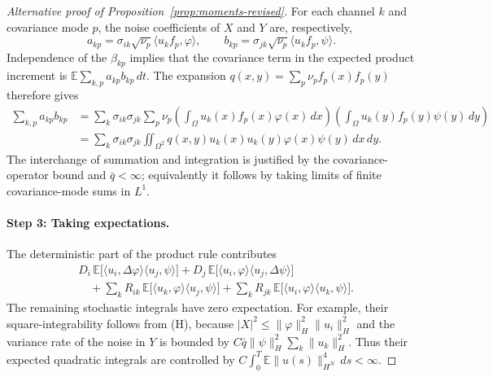 \begin{proof}[Alternative proof of Proposition~\ref{prop:moments-revised}]
For each channel $k$ and covariance mode $p$, the noise coefficients
of $X$ and $Y$ are, respectively,
\[
a_{kp}=\sigma_{ik}\sqrt{\nu_p}\langle u_k f_p,\varphi\rangle,
\qquad
b_{kp}=\sigma_{jk}\sqrt{\nu_p}\langle u_k f_p,\psi\rangle.
\]
Independence of the $\beta_{kp}$ implies that the covariance term
in the expected product increment is
$\mathbb E\sum_{k,p}a_{kp}b_{kp}\,dt$.
The expansion $q(x,y)=\sum_p\nu_p f_p(x)f_p(y)$ therefore gives
\begin{align*}
\sum_{k,p}a_{kp}b_{kp}
&=\sum_k\sigma_{ik}\sigma_{jk}
  \sum_p\nu_p
   \left(\int_{\Omega}u_k(x)f_p(x)\varphi(x)\,dx\right)
   \left(\int_{\Omega}u_k(y)f_p(y)\psi(y)\,dy\right)\\
&=\sum_k\sigma_{ik}\sigma_{jk}
  \iint_{\Omega^2}q(x,y)u_k(x)u_k(y)
                         \varphi(x)\psi(y)\,dx\,dy.
\end{align*}
The interchange of summation and integration is justified by the
covariance-operator bound and $\bar q<\infty$; equivalently it follows
by taking limits of finite covariance-mode sums in $L^1$.

\paragraph{Step 3: Taking expectations.}
The deterministic part of the product rule contributes
\begin{align*}
& D_i\,\mathbb E\!\big[\langle u_i,\Delta\varphi\rangle
                         \langle u_j,\psi\rangle\big]
 +D_j\,\mathbb E\!\big[\langle u_i,\varphi\rangle
                         \langle u_j,\Delta\psi\rangle\big]\\
&\quad+\sum_k R_{ik}\,\mathbb E\!\big[
         \langle u_k,\varphi\rangle\langle u_j,\psi\rangle\big]
 +\sum_k R_{jk}\,\mathbb E\!\big[
         \langle u_i,\varphi\rangle\langle u_k,\psi\rangle\big].
\end{align*}
The remaining stochastic integrals have zero expectation.
For example, their square-integrability follows from (H), because
$|X|^2\leq\|\varphi\|_H^2\|u_i\|_H^2$ and the variance rate of the
noise in $Y$ is bounded by
$C\bar q\|\psi\|_H^2\sum_k\|u_k\|_H^2$.
Thus their expected quadratic integrals are controlled by
$C\int_0^T\mathbb E\|u(s)\|_{H^N}^4\,ds<\infty$.


\end{proof}
